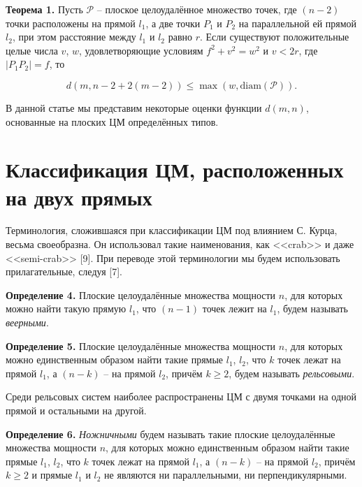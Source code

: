 \documentclass[12pt]{article}
\begin{document}
\par
\textbf{Теорема 1.}
Пусть $\mathcal{P}$ -- плоское целоудалённое множество точек,
где $(n - 2)$ точки  расположены на прямой $l_{1}$, а две точки
$P_{1}$ и  $P_{2}$ на параллельной ей прямой $l_{2}$, при этом расстояние
между $l_{1}$ и $l_{2}$ равно $r$. Если существуют положительные целые числа
$v$, $w$, удовлетворяющие условиям $f^{2} + v^{2}
= w^{2}$ и $v < 2r$, где $|P_{1}P_{2}| = f$,
то

\begin{equation}
d(m, n - 2 + 2(m - 2)) \leq \max(w, \operatorname{diam(\mathcal{P})})
.
\end{equation}

В данной статье мы представим некоторые оценки функции $d(m,n)$, основанные на плоских ЦМ определённых типов.

\section{Классификация ЦМ, расположенных на двух прямых}


Терминология, сложившаяся при классификации ЦМ под влиянием С. Курца, весьма своеобразна. Он использовал такие наименования, как
<<crab>> и даже <<semi-crab>> [9]. %
При переводе этой терминологии мы будем использовать прилагательные, следуя [7]. %

\par
\textbf{Определение 4.}
Плоские целоудалённые множества мощности $n$, для которых можно найти такую прямую $l_1$, что
$(n - 1)$ точек лежит на $l_1$, будем называть \textit{веерными}.

\par
\textbf{Определение 5.}
Плоские целоудалённые множества мощности $n$, для которых можно единственным образом найти такие прямые $l_1$, $l_2$,
что $k$ точек лежат на прямой $l_1$, а $(n - k)$ -- на прямой $l_2$, причём $k \geq 2$, будем называть \textit{рельсовыми}.

Среди рельсовых систем наиболее распространены ЦМ с двумя точками на одной прямой и остальными на другой.

\par
\textbf{Определение 6.}
\textit{Ножничными} будем называть такие плоские целоудалённые множества мощности $n$, для которых можно единственным
образом найти такие прямые $l_1$, $l_2$, что $k$ точек лежат на прямой $l_1$, а $(n - k)$ -- на прямой $l_2$, причём $k \geq 2$ и
прямые $l_1$ и $l_2$ не являются ни параллельными, ни перпендикулярными.
\end{document}
